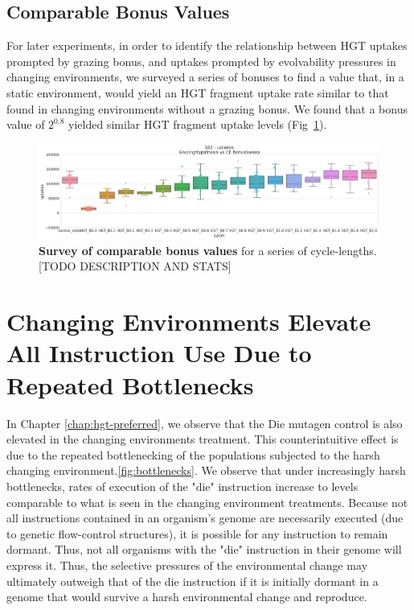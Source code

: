 \documentclass[PhD]{msu-thesis}
\begin{document}
\begin{appendices}
\section{Comparable Bonus Values}
For later experiments, in order to identify the relationship between HGT uptakes prompted by grazing bonus, and uptakes prompted by evolvability pressures in changing environments, we surveyed a series of bonuses to find a value that, in a static environment, would yield an HGT fragment uptake rate similar to that found in changing environments without a grazing bonus. We found that a bonus value of $2^{0.8}$ yielded similar HGT fragment uptake levels (Fig~\ref{fig:a2-hgt-bonusvsce-hgtuse}).
	\begin{figure}[!h]
	\includegraphics[trim={0 0 0 0}, clip, width=0.85\columnwidth]{figures/A2/a2-hgt-bonusvsce-hgtuse.png}
	\caption{\textbf{Survey of comparable bonus values} for a series of cycle-lengths. [TODO DESCRIPTION AND STATS]%
	}
	\label{fig:a2-hgt-bonusvsce-hgtuse}
	\end{figure}




\chapter{Changing Environments Elevate All Instruction Use Due to Repeated Bottlenecks}
In Chapter \ref{chap:hgt-preferred}, we observe that the Die mutagen control is also elevated in the changing environments treatment. This counterintuitive effect is due to the repeated bottlenecking of the populations subjected to the harsh changing environment.\ref{fig:bottlenecks}. We observe that under increasingly harsh bottlenecks, rates of execution of the "die" instruction increase to levels comparable to what is seen in the changing environment treatments. Because not all instructions contained in an organism's genome are necessarily executed (due to genetic flow-control structures), it is possible for any instruction to remain dormant. Thus, not all organisms with the "die" instruction in their genome will express it. Thus, the selective pressures of the environmental change may ultimately outweigh that of the die instruction if it is initially dormant in a genome that would survive a harsh environmental change and reproduce. 


\end{appendices}
\end{document}
